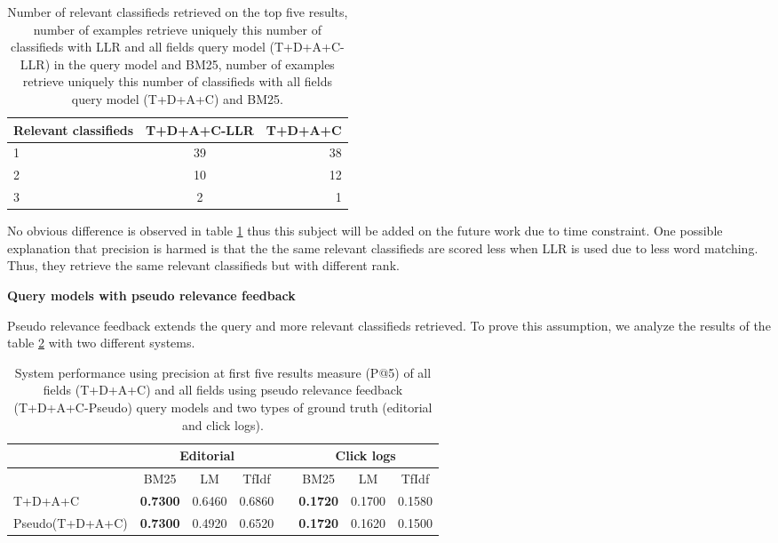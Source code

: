 \begin{table}[H]
\begin{center}
\caption{Number of relevant classifieds retrieved on the top five results, number of examples retrieve uniquely this number of classifieds with LLR and all fields query model (T+D+A+C-LLR) in the query model and BM25, number of examples retrieve uniquely this number of classifieds with all fields query model (T+D+A+C) and BM25.}
\label{table:LLRP5}

\begin{tabular}{lcr}
\midrule
Relevant classifieds &  T+D+A+C-LLR & T+D+A+C \\
\midrule
	1 & 39 & 38 \\
	2 & 10 & 12  \\
	3 & 2 & 1 \\
\bottomrule
\end{tabular}
\end{center}
\end{table}



No obvious difference is observed in table \ref{table:LLRP5} thus this subject will be added on the future work due to time constraint. One possible explanation that precision is harmed is that the the same relevant classifieds are scored less when LLR is used due to less word matching. Thus, they retrieve the same relevant classifieds but with different rank.


 \textbf{Query models with pseudo relevance feedback}

 Pseudo relevance feedback extends the query and more relevant classifieds retrieved. To prove this assumption, we analyze the results of the table \ref{table:PseudoP5} with two different systems.

\begin{table}[H]
\begin{center}
\caption{System performance   using precision at first five results measure (P@5) of all fields (T+D+A+C) and all fields using pseudo relevance feedback (T+D+A+C-Pseudo) query models and two types of ground truth (editorial and click logs).}
\label{table:PseudoP5}
\begin{tabular}{lccccccc}
\toprule
 & \multicolumn{3}{c}{Editorial} & & \multicolumn{3}{c}{Click logs} \\
\midrule
& BM25 & LM & TfIdf &   & BM25 & LM & TfIdf \\
\midrule
	T+D+A+C & \textbf{0.7300} & 0.6460 & 0.6860 &   &		 \textbf{0.1720} & 0.1700 & 0.1580 \\
	Pseudo(T+D+A+C) & \textbf{0.7300} & 0.4920 & 0.6520 &   & \textbf{0.1720} & 0.1620 & 0.1500 \\
\bottomrule
\end{tabular}
\end{center}
\end{table}

